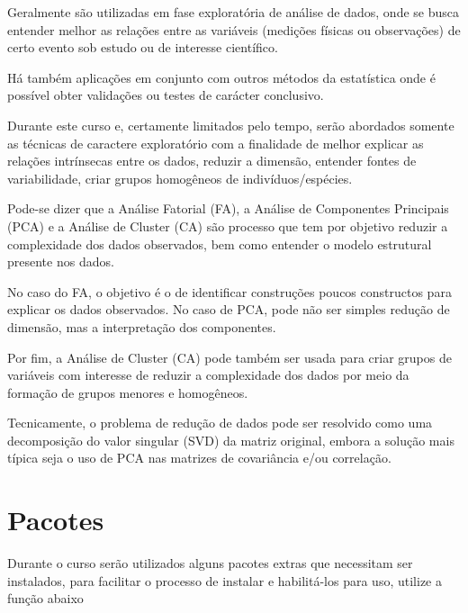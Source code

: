 \documentclass[]{book}
\newenvironment{Shaded}{\begin{snugshade}}{\end{snugshade}}
\newcommand{\KeywordTok}[1]{\textcolor[rgb]{0.13,0.29,0.53}{\textbf{{#1}}}}
\newcommand{\DataTypeTok}[1]{\textcolor[rgb]{0.13,0.29,0.53}{{#1}}}
\newcommand{\DecValTok}[1]{\textcolor[rgb]{0.00,0.00,0.81}{{#1}}}
\newcommand{\StringTok}[1]{\textcolor[rgb]{0.31,0.60,0.02}{{#1}}}
\newcommand{\OtherTok}[1]{\textcolor[rgb]{0.56,0.35,0.01}{{#1}}}
\newcommand{\NormalTok}[1]{{#1}}
\begin{document}
Geralmente são utilizadas em fase exploratória de análise de dados, onde
se busca entender melhor as relações entre as variáveis (medições
físicas ou observações) de certo evento sob estudo ou de interesse
científico.

Há também aplicações em conjunto com outros métodos da estatística onde
é possível obter validações ou testes de carácter conclusivo.

Durante este curso e, certamente limitados pelo tempo, serão abordados
somente as técnicas de caractere exploratório com a finalidade de melhor
explicar as relações intrínsecas entre os dados, reduzir a dimensão,
entender fontes de variabilidade, criar grupos homogêneos de
indivíduos/espécies.

Pode-se dizer que a Análise Fatorial (FA), a Análise de Componentes
Principais (PCA) e a Análise de Cluster (CA) são processo que tem por
objetivo reduzir a complexidade dos dados observados, bem como entender
o modelo estrutural presente nos dados.

No caso do FA, o objetivo é o de identificar construções poucos
constructos para explicar os dados observados. No caso de PCA, pode não
ser simples redução de dimensão, mas a interpretação dos componentes.

Por fim, a Análise de Cluster (CA) pode também ser usada para criar
grupos de variáveis com interesse de reduzir a complexidade dos dados
por meio da formação de grupos menores e homogêneos.

Tecnicamente, o problema de redução de dados pode ser resolvido como uma
decomposição do valor singular (SVD) da matriz original, embora a
solução mais típica seja o uso de PCA nas matrizes de covariância e/ou
correlação.

\section{Pacotes}\label{pacotes}

Durante o curso serão utilizados alguns pacotes extras que necessitam
ser instalados, para facilitar o processo de instalar e habilitá-los
para uso, utilize a função abaixo

\begin{Shaded}
\end{Shaded}
\end{document}
